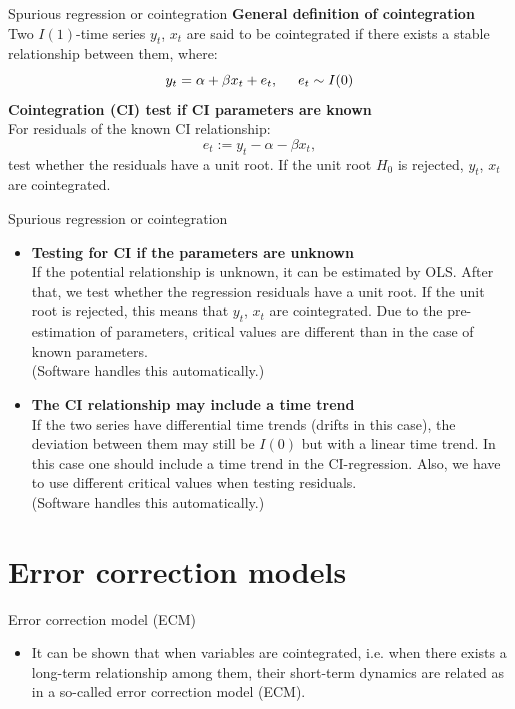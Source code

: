\documentclass[usenames,dvipsnames]{beamer}
\begin{document}
\begin{frame}{Spurious regression or cointegration}
\textbf{General definition of cointegration}\\
\vspace{0.5cm}
Two $I(1)$-time series $y_t$, $x_t$ are said to be cointegrated if there exists a stable relationship between them, where:
$$ y_t=\alpha+\beta x_t + e_t, 
\hspace{0.5cm} e_t \sim I(0)$$
\textbf{Cointegration (CI) test if CI parameters are known}\\
\vspace{0.5cm}
For residuals of the known CI relationship:
$$e_t := y_t-\alpha-\beta x_t, $$
test whether the residuals have a unit root. If the unit root $H_0$ is rejected, $y_t$, $x_t$ are cointegrated. 
\end{frame}


\begin{frame}{Spurious regression or cointegration}
\begin{itemize}
\item \textbf{Testing for CI if the parameters are unknown}\\
If the potential relationship is unknown, it can be estimated by OLS. After that, we test whether the regression residuals have a unit root. If the unit root is rejected, this means that $y_t$, $x_t$ are cointegrated. Due to the pre-estimation of parameters, critical values are different than in the case of known parameters. \\(Software handles this automatically.)
\item \textbf{The CI relationship may include a time trend}\\
If the two series have differential time trends (drifts in this case), the deviation between them may still be $I(0)$ but with a linear time trend. In this case one should include a time trend in the CI-regression. Also, we have to use different critical values when testing residuals.
\\(Software handles this automatically.)
\end{itemize}
\end{frame}


\section{Error correction models}
\begin{frame}{Error correction model (ECM)}
\begin{itemize}
\item It can be shown that when variables are cointegrated, i.e. when there exists a long-term relationship among them, their short-term dynamics are related as in a so-called error correction model (ECM).
\end{itemize}
\end{frame}
\end{document}
